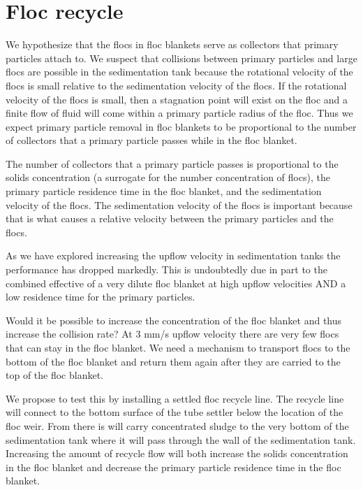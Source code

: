\documentclass[letterpaper,10pt,english]{sphinxmanual}
\begin{document}
\section{Floc recycle}
\label{\detokenize{Sedimentation/Sed_Theory_and_Future_Work:floc-recycle}}\label{\detokenize{Sedimentation/Sed_Theory_and_Future_Work:id2}}
We hypothesize that the flocs in floc blankets serve as collectors that primary particles attach to. We suspect that collisions between primary particles and large flocs are possible in the sedimentation tank because the rotational velocity of the flocs is small relative to the sedimentation velocity of the flocs. If the rotational velocity of the flocs is small, then a stagnation point will exist on the floc and a finite flow of fluid will come within a primary particle radius of the floc. Thus we expect primary particle removal in floc blankets to be proportional to the number of collectors that a primary particle passes while in the floc blanket.

The number of collectors that a primary particle passes is proportional to the solids concentration (a surrogate for the number concentration of flocs), the primary particle residence time in the floc blanket, and the sedimentation velocity of the flocs. The sedimentation velocity of the flocs is important because that is what causes a relative velocity between the primary particles and the flocs.

As we have explored increasing the upflow velocity in sedimentation tanks the performance has dropped markedly. This is undoubtedly due in part to the combined effective of a very dilute floc blanket at high upflow velocities AND a low residence time for the primary particles.

Would it be possible to increase the concentration of the floc blanket and thus increase the collision rate? At 3 mm/s upflow velocity there are very few flocs that can stay in the floc blanket. We need a mechanism to transport flocs to the bottom of the floc blanket and return them again after they are carried to the top of the floc blanket.

We propose to test this by installing a settled floc recycle line. The recycle line will connect to the bottom surface of the tube settler below the location of the floc weir. From there is will carry concentrated sludge to the very bottom of the sedimentation tank where it will pass through the wall of the sedimentation tank. Increasing the amount of recycle flow will both increase the solids concentration in the floc blanket and decrease the primary particle residence time in the floc blanket.
\end{document}
